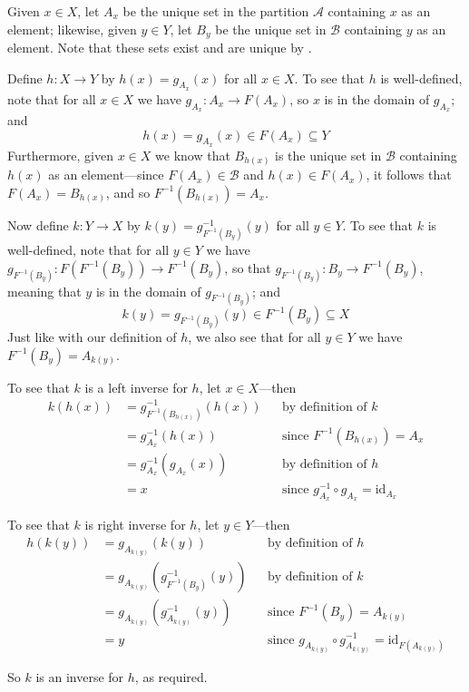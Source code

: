 \begin{cproof}
Given $x \in X$, let $A_x$ be the unique set in the partition $\mathcal{A}$ containing $x$ as an element; likewise, given $y \in Y$, let $B_y$ be the unique set in $\mathcal{B}$ containing $y$ as an element. Note that these sets exist and are unique by .

Define $h : X \to Y$ by $h(x) = g_{A_x}(x)$ for all $x \in X$. To see that $h$ is well-defined, note that for all $x \in X$ we have $g_{A_x} : A_x \to F(A_x)$, so $x$ is in the domain of $g_{A_x}$; and
\[ h(x) = g_{A_x}(x) \in F(A_x) \subseteq Y \]
Furthermore, given $x \in X$ we know that $B_{h(x)}$ is the unique set in $\mathcal{B}$ containing $h(x)$ as an element---since $F(A_x) \in \mathcal{B}$ and $h(x) \in F(A_x)$, it follows that $F(A_x) = B_{h(x)}$, and so $F^{-1}(B_{h(x)}) = A_x$.

Now define $k : Y \to X$ by $k(y) = g_{F^{-1}(B_y)}^{-1}(y)$ for all $y \in Y$. To see that $k$ is well-defined, note that for all $y \in Y$ we have $g_{F^{-1}(B_y)} : F(F^{-1}(B_y)) \to F^{-1}(B_y)$, so that $g_{F^{-1}(B_y)} : B_y \to F^{-1}(B_y)$, meaning that $y$ is in the domain of $g_{F^{-1}(B_y)}$; and
\[ k(y) = g_{F^{-1}(B_y)}(y) \in F^{-1}(B_y) \subseteq X \]
Just like with our definition of $h$, we also see that for all $y \in Y$ we have $F^{-1}(B_y) = A_{k(y)}$.

To see that $k$ is a left inverse for $h$, let $x \in X$---then
\begin{align*}
k(h(x)) &= g_{F^{-1}(B_{h(x)})}^{-1}(h(x)) && \text{by definition of $k$} \\
&= g_{A_x}^{-1}(h(x)) && \text{since $F^{-1}(B_{h(x)}) = A_x$} \\
&= g_{A_x}^{-1}(g_{A_x}(x)) && \text{by definition of $h$} \\
&= x && \text{since $g_{A_x}^{-1} \circ g_{A_x} = \mathrm{id}_{A_x}$}
\end{align*}

To see that $k$ is right inverse for $h$, let $y \in Y$---then
\begin{align*}
h(k(y)) &= g_{A_{k(y)}}(k(y)) && \text{by definition of $h$} \\
&= g_{A_{k(y)}}(g_{F^{-1}(B_y)}^{-1}(y)) && \text{by definition of $k$} \\
&= g_{A_{k(y)}}(g_{A_{k(y)}}^{-1}(y)) && \text{since $F^{-1}(B_y) = A_{k(y)}$} \\
&= y && \text{since $g_{A_{k(y)}} \circ g_{A_{k(y)}}^{-1} = \mathrm{id}_{F(A_{k(y)})}$}
\end{align*}

So $k$ is an inverse for $h$, as required.
\end{cproof}

